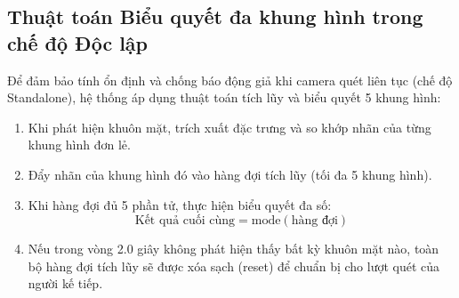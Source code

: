 \documentclass[12pt,a4paper]{article}
\begin{document}
\subsection{Thuật toán Biểu quyết đa khung hình trong chế độ Độc lập}
Để đảm bảo tính ổn định và chống báo động giả khi camera quét liên tục (chế độ Standalone), hệ thống áp dụng thuật toán tích lũy và biểu quyết 5 khung hình:
\begin{enumerate}
    \item Khi phát hiện khuôn mặt, trích xuất đặc trưng và so khớp nhãn của từng khung hình đơn lẻ.
    \item Đẩy nhãn của khung hình đó vào hàng đợi tích lũy (tối đa 5 khung hình).
    \item Khi hàng đợi đủ 5 phần tử, thực hiện biểu quyết đa số:
    \begin{equation}
    \text{Kết quả cuối cùng} = \text{mode}(\text{hàng đợi})
    \end{equation}
    \item Nếu trong vòng 2.0 giây không phát hiện thấy bất kỳ khuôn mặt nào, toàn bộ hàng đợi tích lũy sẽ được xóa sạch (reset) để chuẩn bị cho lượt quét của người kế tiếp.
\end{enumerate}
\end{document}

